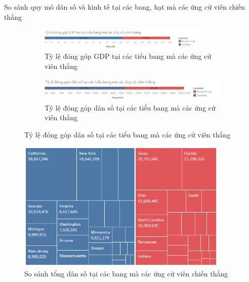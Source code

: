 \documentclass[10pt]{beamer}
\theoremstyle{remark}
\theoremstyle{definition}
\begin{document}
\begin{frame}{So sánh quy mô dân số và kinh tế tại các bang, hạt mà các ứng cử viên chiến thắng}
	\begin{figure}[h!]
        \centering
        \begin{subfigure}[b]{\textwidth}
            \includegraphics[width=0.9\textwidth]{State_Percentage_GDP_Candidate.png}
            \caption{Tỷ lệ đóng góp GDP tại các tiểu bang mà các ứng cử viên thắng}
        \end{subfigure}
        \vfill
        \begin{subfigure}[b]{\linewidth}
            \includegraphics[width=0.9\linewidth]{State_Percentage_Population_Candidate.png}
            \caption{Tỷ lệ đóng góp dân số tại các tiểu bang mà các ứng cử viên thắng}
        \end{subfigure}
    \end{figure}
	
\end{frame}

\begin{frame}
    \begin{figure}[h!]
        \centering
        \includegraphics[width=0.9\textwidth]{figures/State_Population_Treemap.png}
        \caption{So sánh tổng dân số tại các bang mà các ứng cử viên chiến thắng}
    \end{figure}
\end{frame}
\end{document}
